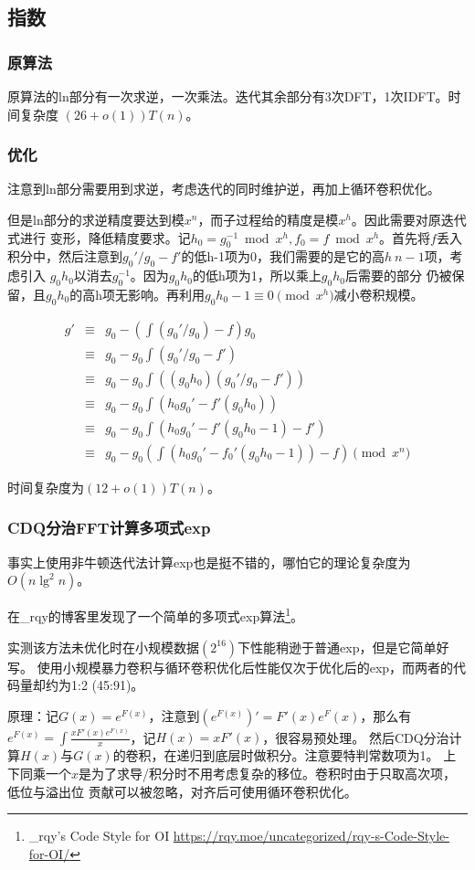 \subsection{指数}
\subsubsection{原算法}
原算法的ln部分有一次求逆，一次乘法。迭代其余部分有3次DFT，1次IDFT。时间复杂度
$(26+o(1))T(n)$。
\subsubsection{优化}
注意到ln部分需要用到求逆，考虑迭代的同时维护逆，再加上循环卷积优化。

但是ln部分的求逆精度要达到模$x^n$，而子过程给的精度是模$x^h$。因此需要对原迭代式进行
变形，降低精度要求。记$h_0=g_0^{-1}\bmod{x^h},f_0=f\bmod{x^h}$。首先将$f$丢入
积分中，然后注意到$g_0'/g_0-f'$的低h-1项为0，我们需要的是它的高$h~n-1$项，考虑引入
$g_0h_0$以消去$g_0^{-1}$。因为$g_0h_0$的低h项为1，所以乘上$g_0h_0$后需要的部分
仍被保留，且$g_0h_0$的高h项无影响。再利用$g_0h_0-1\equiv 0 \pmod{x^h}$减小卷积规模。

\begin{eqnarray*}
    g'&\equiv&g_0-(\int(g_0'/g_0)-f)g_0\\
    &\equiv&g_0-g_0\int(g_0'/g_0-f')\\
    &\equiv&g_0-g_0\int((g_0h_0)(g_0'/g_0-f'))\\
    &\equiv&g_0-g_0\int(h_0g_0'-f'(g_0h_0))\\
    &\equiv&g_0-g_0\int(h_0g_0'-f'(g_0h_0-1)-f')\\
    &\equiv&g_0-g_0(\int(h_0g_0'-f_0'(g_0h_0-1))-f) \pmod{x^n}
\end{eqnarray*}

时间复杂度为$(12+o(1))T(n)$。
\subsubsection{CDQ分治FFT计算多项式exp}
事实上使用非牛顿迭代法计算exp也是挺不错的，哪怕它的理论复杂度为$O(n\lg^2n)$。

在\_rqy的博客里发现了一个简单的多项式exp算法\footnote{
    \_rqy's Code Style for OI
    \url{https://rqy.moe/uncategorized/rqy-s-Code-Style-for-OI/}
}。

实测该方法未优化时在小规模数据$(2^{16})$下性能稍逊于普通exp，但是它简单好写。
使用小规模暴力卷积与循环卷积优化后性能仅次于优化后的exp，而两者的代码量却约为1:2
(45:91)。

原理：记$G(x)=e^{F(x)}$，注意到$(e^{F(x)})'=F'(x)e^F(x)$，那么有
$e^{F(x)}=\int{\frac{xF'(x)e^{F(x)}}{x}}$，记$H(x)=xF'(x)$，很容易预处理。
然后CDQ分治计算$H(x)$与$G(x)$的卷积，在递归到底层时做积分。注意要特判常数项为1。
上下同乘一个$x$是为了求导/积分时不用考虑复杂的移位。卷积时由于只取高次项，低位与溢出位
贡献可以被忽略，对齐后可使用循环卷积优化。
